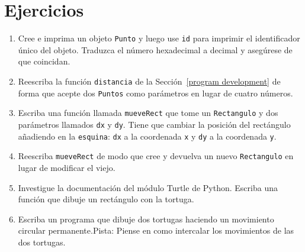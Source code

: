 \section{Ejercicios}
\begin{enumerate}
\item Cree e imprima un objeto \texttt{Punto} y luego use \texttt{id} para
imprimir el identificador único del objeto. Traduzca el número hexadecimal
a decimal y asegúrese de que coincidan.
\item Reescriba la función \texttt{distancia} de la Sección~\ref{program development}
de forma que acepte dos \texttt{Puntos} como parámetros en lugar de
cuatro números.
\item Escriba una función llamada \texttt{mueveRect} que tome un \texttt{Rectangulo}
y dos parámetros llamados \texttt{dx} y \texttt{dy}. Tiene que cambiar
la posición del rectángulo añadiendo en la \texttt{esquina}: \texttt{dx}
a la coordenada \texttt{x} y \texttt{dy} a la coordenada \texttt{y}.
\item Reescriba \texttt{mueveRect} de modo que cree y devuelva un nuevo
\texttt{Rectangulo} en lugar de modificar el viejo.
\item Investigue la documentación del módulo Turtle de Python. Escriba una
función que dibuje un rectángulo con la tortuga.
\item Escriba un programa que dibuje dos tortugas haciendo un movimiento
circular permanente.Pista: Piense en como intercalar los movimientos
de las dos tortugas.
\end{enumerate}

